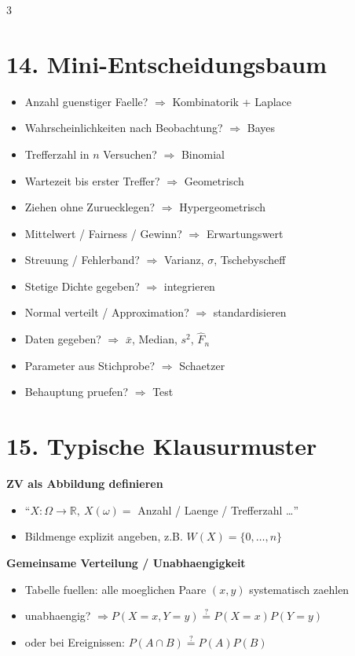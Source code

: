 \documentclass[a4paper,8pt,landscape]{article}
\begin{document}
\begin{multicols*}{3}
\section*{14. Mini-Entscheidungsbaum}
\begin{itemize}
  \item Anzahl guenstiger Faelle? $\Rightarrow$ Kombinatorik + Laplace
  \item Wahrscheinlichkeiten nach Beobachtung? $\Rightarrow$ Bayes
  \item Trefferzahl in $n$ Versuchen? $\Rightarrow$ Binomial
  \item Wartezeit bis erster Treffer? $\Rightarrow$ Geometrisch
  \item Ziehen ohne Zuruecklegen? $\Rightarrow$ Hypergeometrisch
  \item Mittelwert / Fairness / Gewinn? $\Rightarrow$ Erwartungswert
  \item Streuung / Fehlerband? $\Rightarrow$ Varianz, $\sigma$, Tschebyscheff
  \item Stetige Dichte gegeben? $\Rightarrow$ integrieren
  \item Normal verteilt / Approximation? $\Rightarrow$ standardisieren
  \item Daten gegeben? $\Rightarrow$ $\bar x$, Median, $s^2$, $\hat F_n$
  \item Parameter aus Stichprobe? $\Rightarrow$ Schaetzer
  \item Behauptung pruefen? $\Rightarrow$ Test
\end{itemize}

\section*{15. Typische Klausurmuster}
\textbf{ZV als Abbildung definieren}
\begin{itemize}
  \item ``$X:\Omega\to\mathbb{R},\ X(\omega)=$ Anzahl / Laenge / Trefferzahl \dots''
  \item Bildmenge explizit angeben, z.B. $W(X)=\{0,\dots,n\}$
\end{itemize}

\textbf{Gemeinsame Verteilung / Unabhaengigkeit}
\begin{itemize}
  \item Tabelle fuellen: alle moeglichen Paare $(x,y)$ systematisch zaehlen
  \item unabhaengig? $\Rightarrow P(X=x,Y=y)\stackrel{?}=P(X=x)P(Y=y)$
  \item oder bei Ereignissen: $P(A\cap B)\stackrel{?}=P(A)P(B)$
\end{itemize}


\end{multicols*}
\end{document}
